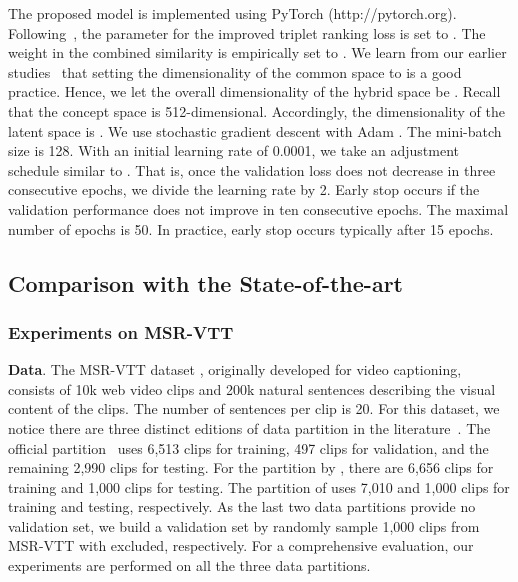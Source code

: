 The proposed model is implemented using PyTorch (http://pytorch.org). Following~\cite{faghri2017vse}, the parameter  for the improved triplet ranking loss is set to . The weight  in the combined similarity is empirically set to . 
We learn from our earlier studies~\cite{li2019w2vv++,cvpr2019-dual-dong} that setting the dimensionality of the common space to  is a good practice. Hence, we let the overall dimensionality of the hybrid space be . Recall that the concept space is 512-dimensional. Accordingly, the dimensionality of the latent space is .
We use stochastic gradient descent with Adam \cite{kingma2014adam}. The mini-batch size is 128. With an initial learning rate of 0.0001, we take an adjustment schedule similar to \cite{dong2018predicting}. That is, once the validation loss does not decrease in three consecutive epochs, we divide the learning rate by 2. Early stop occurs if the validation performance does not improve in ten consecutive epochs. The maximal number of epochs is 50. In practice, early stop occurs typically after 15 epochs. 



\subsection{Comparison with the State-of-the-art} \label{ssec:exp-sota}


\subsubsection{Experiments on MSR-VTT}

\textbf{Data}. 
The MSR-VTT dataset \cite{xu2016msr}, originally developed for video captioning, consists of 10k web video clips and 200k natural sentences describing the visual content of the clips. The number of sentences per clip is 20. 
For this dataset, we notice there are three distinct editions of data partition in the literature~\cite{xu2016msr,miech2018learning,yu2018joint}.
The official partition~\cite{xu2016msr} uses 6,513 clips for training, 497 clips for validation, and the remaining 2,990 clips for testing.
For the partition by \cite{miech2018learning}, there are 6,656 clips for training and 1,000 clips for testing. The partition of \cite{yu2018joint} uses 7,010 and 1,000 clips for training and testing, respectively. 
As the last two data partitions provide no validation set, we build a validation set by randomly sample 1,000 clips from MSR-VTT with \cite{miech2018learning,yu2018joint} excluded, respectively.
For a comprehensive evaluation, our experiments are performed on all the three data partitions.


